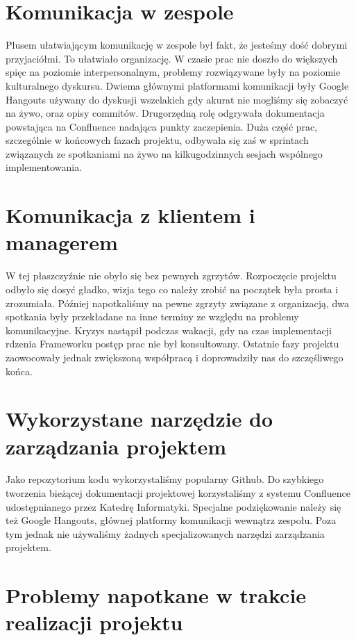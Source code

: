 \section{Komunikacja w zespole}
Plusem ułatwiającym komunikację w zespole był fakt, że jesteśmy dość dobrymi przyjaciółmi. To ułatwiało organizację. W czasie prac nie doszło do większych spięc na poziomie interpersonalnym, problemy rozwiązywane były na poziomie kulturalnego dyskursu. Dwiema głównymi platformami komunikacji były Google Hangouts używany do dyskusji wszelakich gdy akurat nie mogliśmy się zobaczyć na żywo, oraz opisy commitów. Drugorzędną rolę odgrywała dokumentacja powstająca na Confluence nadająca punkty zaczepienia. Duża część prac, szczególnie w końcowych fazach projektu, odbywała się zaś w sprintach związanych ze spotkaniami na żywo na kilkugodzinnych sesjach wspólnego implementowania.

\section{Komunikacja z klientem i managerem}
W tej płaszczyźnie nie obyło się bez pewnych zgrzytów. Rozpoczęcie projektu odbyło się dosyć gładko, wizja tego co należy zrobić na początek była prosta i zrozumiała. Później napotkaliśmy na pewne zgrzyty związane z organizacją, dwa spotkania były przekładane na inne terminy ze względu na problemy komunikacyjne. Kryzys nastąpił podczas wakacji, gdy na czas implementacji rdzenia Frameworku postęp prac nie był konsultowany. Ostatnie fazy projektu zaowocowały jednak zwiększoną współpracą i doprowadziły nas do szczęśliwego końca.

\section{Wykorzystane narzędzie do zarządzania projektem}
Jako repozytorium kodu wykorzystaliśmy popularny Github. Do szybkiego tworzenia bieżącej dokumentacji projektowej korzystaliśmy z systemu Confluence udostępnianego przez Katedrę Informatyki. Specjalne podziękowanie należy się też Google Hangouts, głównej platformy komunikacji wewnątrz zespołu. Poza tym jednak nie używaliśmy żadnych specjalizowanych narzędzi zarządzania projektem.

\section{Problemy napotkane w trakcie realizacji projektu}
\label{problem}

